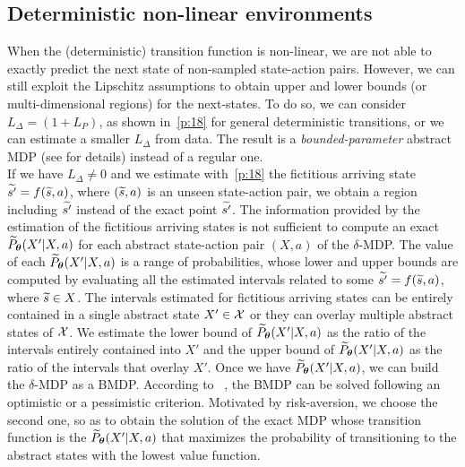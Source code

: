 \subsection{Deterministic non-linear environments} \label{app:b2}
When the (deterministic) transition function is non-linear, we are not able to exactly predict the next state of non-sampled state-action pairs. However, we can still exploit the Lipschitz assumptions to obtain upper and lower bounds (or multi-dimensional regions) for the next-states. To do so, we can consider $L_{\Delta} = \left(1 + L_{P} \right)$, as shown in~\eqref{p:18} for general deterministic transitions, or we can estimate a smaller $L_{\Delta}$ from data.
The result is a \emph{bounded-parameter} abstract \ac{MDP} (see  for details) instead of a regular one.\\
\newline
If we have $L_{\Delta} \neq 0$ and we estimate with~\eqref{p:18} the fictitious arriving state $\widetilde{s'} = f(\widetilde{s}, a)$, where $(\widetilde{s},a)$ is an unseen state-action pair, we obtain a region including $\widetilde{s'}$ instead of the exact point $\widetilde{s'}$. The information provided by the estimation of the fictitious arriving states is not sufficient to compute an exact $\widetilde{P}_{\boldsymbol{\theta}}(X'|X,a)$ for each abstract state-action pair $(X,a)$ of the $\delta$-\ac{MDP}. The value of each $\widetilde{P}_{\boldsymbol{\theta}}(X'|X,a)$ is a range of probabilities, whose lower and upper bounds are computed by evaluating all the estimated intervals related to some $\widetilde{s'}=f(\widetilde{s}, a)$, where $\widetilde{s} \in X$. The intervals estimated for fictitious arriving states can be entirely contained in a single abstract state $X' \in \mathcal{X}$ or they can overlay multiple abstract states of $\mathcal{X}$. We estimate the lower bound of $\widetilde{P}_{\boldsymbol{\theta}}(X'|X,a)$ as the ratio of the intervals entirely contained into $X'$ and the upper bound of $\widetilde{P}_{\boldsymbol{\theta}}(X'|X,a)$ as the ratio of the intervals that overlay $X'$. Once we have $\widetilde{P}_{\boldsymbol{\theta}}(X'|X,a)$, we can build the $\delta$-\ac{MDP} as a \ac{BMDP}. According to ~\citep{givan2000bounded}, the \ac{BMDP} can be solved following an optimistic or a pessimistic criterion. Motivated by risk-aversion, we choose the second one, so as to obtain the solution of the exact \ac{MDP} whose transition function is the $\widetilde{P}_{\boldsymbol{\theta}}(X'|X,a)$ that maximizes the probability of transitioning to the abstract states with the lowest value function.

